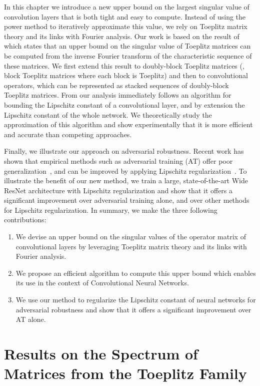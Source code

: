 In this chapter we introduce a new upper bound on the largest singular value of convolution layers that is both tight and easy to compute.
Instead of using the power method to iteratively approximate this value, we rely on Toeplitz matrix theory and its links with Fourier analysis.
Our work is based on the result of~\citet{gray2006toeplitz} which states that an upper bound on the singular value of Toeplitz matrices can be computed from the inverse Fourier transform of the characteristic sequence of these matrices.
We first extend this result to doubly-block Toeplitz matrices (\ie, block Toeplitz matrices where each block is Toeplitz) and then to convolutional operators, which can be represented as stacked sequences of doubly-block Toeplitz matrices.
From our analysis immediately follows an algorithm for bounding the Lipschitz constant of a convolutional layer, and by extension the Lipschitz constant of the whole network.
We theoretically study the approximation of this algorithm and show experimentally that it is more efficient and accurate than competing approaches.

Finally, we illustrate our approach on adversarial robustness.
Recent work has shown that empirical methods such as adversarial training (AT) offer poor generalization~\cite{schmidt2018adversarially}, and can be improved by applying Lipschitz regularization~\cite{farnia2018generalizable}.
To illustrate the benefit of our new method, we train a large, state-of-the-art Wide ResNet architecture with Lipschitz regularization and show that it offers a significant improvement over adversarial training alone, and over other methods for Lipschitz regularization.
In summary, we make the three following contributions:
\begin{enumerate}
  \item We devise an upper bound on the singular values of the operator matrix of convolutional layers by leveraging Toeplitz matrix theory and its links with Fourier analysis.
  \item We propose an efficient algorithm to compute this upper bound which enables its use in the context of Convolutional Neural Networks.
  \item We use our method to regularize the Lipschitz constant of neural networks for adversarial robustness and show that it offers a significant improvement over AT alone.
\end{enumerate}


\section{Results on the Spectrum of Matrices from the Toeplitz Family}
\label{section:ch5-results_on_the_spectrum_of_matrices_from_the_toeplitz_family}

